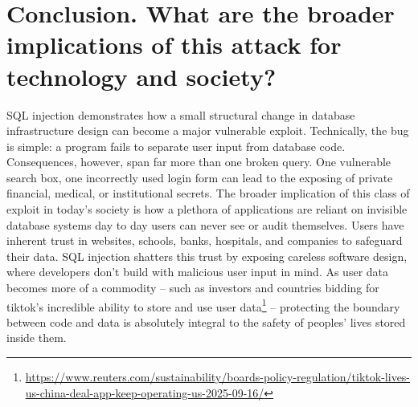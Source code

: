 \documentclass[12pt]{article}
\begin{document}
\section{Conclusion. What are the broader implications of this attack for technology and society?}

SQL injection demonstrates how a small structural change in database infrastructure design can become a major vulnerable exploit. Technically, the bug is simple: a program fails to separate user input from database code. Consequences, however, span far more than one broken query. One vulnerable search box, one incorrectly used login form can lead to the exposing of private financial, medical, or institutional secrets. The broader implication of this class of exploit in today’s society is how a plethora of applications are reliant on invisible database systems day to day users can never see or audit themselves. Users have inherent trust in websites, schools, banks, hospitals, and companies to safeguard their data. SQL injection shatters this trust by exposing careless software design, where developers don’t build with malicious user input in mind. As user data becomes more of a commodity -- such as investors and countries bidding for tiktok’s incredible ability to store and use user data\footnote{\url{https://www.reuters.com/sustainability/boards-policy-regulation/tiktok-lives-us-china-deal-app-keep-operating-us-2025-09-16/}} -- protecting the boundary between code and data is absolutely integral to the safety of peoples’ lives stored inside them.
\end{document}
